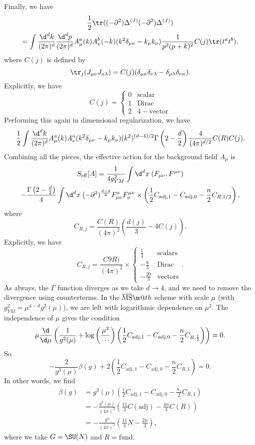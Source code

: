 \documentclass[a4paper]{article}
\makeatletter
\newcommand*{\textoverline}[1]{$\overline{\hbox{#1}}\m@th$}
\makeatother
\begin{document}
Finally, we have
\begin{multline*}
  \frac{1}{2} \tr ((-\partial^2) \Delta^{(J)} (-\partial^2) \Delta^{(J)}) \\
  = \int \frac{\d^d k}{(2\pi)^d} \frac{\d^d p}{(2\pi)^d} A_\mu^a(k) A_\nu^b(-k) (k^2 \delta_{\mu\nu} - k_\mu k_\nu) \frac{1}{p^2(p + k)^2} C(j) \tr (t^a t^b),
\end{multline*}
where $C(j)$ is defined by
\[
  \tr_j (J_{\mu\nu} J_{\kappa\lambda}) = C(j) (\delta_{\mu\kappa} \delta_{\nu\lambda} - \delta_{\mu\lambda} \delta_{\nu\kappa}).
\]
Explicitly, we have
\[
  C(j) =
  \begin{cases}
    0 & \mathrm{scalar}\\
    1 & \mathrm{Dirac}\\
    2 & \mathrm{4-vector}
  \end{cases}
\]
Performing this again in dimensional regularization, we have
\[
  \frac{1}{2} \int \frac{\d^d k}{(2\pi)^d} A_\mu^a (k) A_\nu^a (k^2 \delta_{\mu\nu} - k_\mu k_\nu) (k^2)^{(d - 4)/2} \Gamma\left(2 - \frac{d}{2}\right) \frac{4}{(4\pi)^{d/2}} C(R) C(j).
\]
Combining all the pieces, the effective action for the background field $A_\mu$ is
\begin{multline*}
  S_{\mathrm{eff}}[A] = \frac{1}{4 g_{YM}^2}\int \d^d x\; (F_{\mu\nu}, F^{\mu\nu}) \\
  - \frac{\Gamma\left(2 - \frac{d}{2}\right)}{4} \int\d^d x\; (-\partial^2)^{\frac{d - 4}{2}} F_{\mu\nu}^a F^{\mu\nu}_a \times \left(\frac{1}{2} C_{\mathrm{adj}, 1} - C_{\mathrm{adj}, 0} - \frac{n}{2} C_{R, 1/2}\right),
\end{multline*}
where
\[
  C_{R, j} = \frac{C(R)}{(4\pi)^2} \left(\frac{d(j)}{3} - 4 C(j)\right).
\]
Explicitly, we have
\[
  C_{R, j} = \frac{C9R)}{(4\pi)^2} \times
  \begin{cases}
    \frac{1}{3} & \mathrm{scalars}\\
    -\frac{8}{3} & \mathrm{Dirac}\\
    -\frac{20}{3} & \mathrm{vectors}
  \end{cases}.
\]
As always, the $\Gamma$ function diverges as we take $d \to 4$, and we need to remove the divergence using counterterms. In the \textoverline{MS} scheme with scale $\mu$ (with $g_{YM}^2 = \mu^{4 - d} g^2(\mu)$), we are left with logarithmic dependence on $\mu^2$. The independence of $\mu$ gives the condition
\[
  \mu\frac{\d}{\d \mu}\left(\frac{1}{g^2(\mu)} + \log \left(\frac{\mu^2}{\cdots}\right)\left(\frac{1}{2} C_{\mathrm{adj}, 1} - C_{\mathrm{adj}, 0} - \frac{n}{2} C_{R, \frac{1}{2}}\right)\right) = 0.
\]
So
\[
  -\frac{2}{g^3(\mu)} \beta(g) + 2\left(\frac{1}{2} C_{\mathrm{adj}, 1} - C_{\mathrm{adj}, 0} - \frac{n}{2} C_{R, 1}\right) = 0.
\]
In other words, we find
\begin{align*}
  \beta(g) &= g^3(\mu) \left(\frac{1}{2} C_{\mathrm{adj}, 1} - C_{\mathrm{adj}, 0} - \frac{n_f}{2} C_{R, 1}\right)\\
  &= - \frac{g^3(\mu)}{(4\pi)^2} \left(\frac{11}{3} C(\mathrm{adj}) - \frac{4n}{3} C(R)\right)\\
  &= - \frac{g^3}{(4\pi)^2} \left(\frac{11}{3} N - \frac{2n}{3}\right),
\end{align*}
where we take $G = \SU(N)$ and $R = \mathrm{fund}$.
\end{document}
